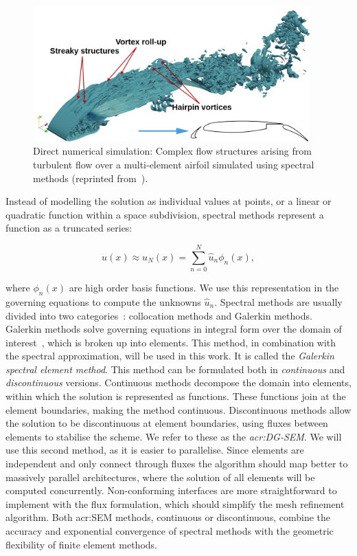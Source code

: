 \begin{figure}[H]
	\centering
	\includegraphics[width=0.95\textwidth]{Chapter_introduction/media/spectral_element_method}
	\caption{Direct numerical simulation: Complex flow structures arising from turbulent flow over a multi-element airfoil simulated using spectral methods (reprinted from~\cite{Vadsola2021}).}\label{fig:intro_sem}
\end{figure}

Instead of modelling the solution as individual values at points, or a linear or quadratic function
within a space subdivision, spectral methods represent a function as a truncated series:

\begin{equation}
	u(x) \approx u_N(x) = \sum_{n = 0}^{N} \widehat{u}_n \phi _n(x),
\end{equation}

\noindent
where \(\phi _n(x)\) are high order basis functions. We use this representation in the governing
equations to compute the unknowns \(\widehat{u}_n\). Spectral methods are usually divided into two
categories~\cite{Karniadakis2005}: collocation methods and Galerkin methods. Galerkin methods solve
governing equations in integral form over the domain of interest~\cite{Reed1973}, which is broken up
into elements. This method, in combination with the spectral approximation, will be used in this
work. It is called the \textit{Galerkin spectral element method}. This method can be formulated both
in \textit{continuous} and \textit{discontinuous} versions. Continuous methods decompose the domain
into elements, within which the solution is represented as functions. These functions join at the
element boundaries, making the method continuous. Discontinuous methods allow the solution to be
discontinuous at element boundaries, using fluxes between elements to stabilise the scheme. We refer
to these as the \textit{\acrfull{acr:DG-SEM}}. We will use this second method, as it is easier to
parallelise. Since elements are independent and only connect through fluxes the algorithm should map
better to massively parallel architectures, where the solution of all elements will be computed
concurrently. Non-conforming interfaces are more straightforward to implement with the flux
formulation, which should simplify the mesh refinement algorithm. Both \acrshort{acr:SEM} methods,
continuous or discontinuous, combine the accuracy and exponential convergence of spectral methods
with the geometric flexibility of finite element methods. 

